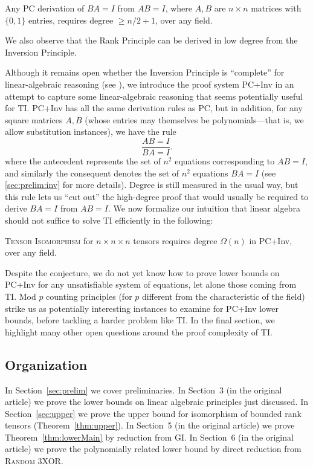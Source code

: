\begin{theorem}
Any PC derivation of $BA = I$ from $AB=I$, where $A,B$ are $n \times n$ matrices with $\{0,1\}$ entries, requires degree $\geq n/2+1$, over any field.
\end{theorem}

We also observe that the Rank Principle can be derived in low degree from the Inversion Principle. 

Although it remains open whether the Inversion Principle is ``complete'' for linear-algebraic reasoning (see \cite{soltys, SC}), we introduce the proof system PC+Inv in an attempt to capture some linear-algebraic reasoning that seems potentially useful for \textsc{TI}. PC+Inv has all the same derivation rules as PC, but in addition, for any square matrices $A,B$ (whose entries may themselves be polynomials---that is, we allow substitution instances), we have the rule
\[
\frac{AB=I}{BA=I}.
\]
where the antecedent represents the set of $n^2$ equations corresponding to $AB=I$, and similarly the consequent denotes the set of $n^2$ equations $BA=I$ (see \ref{sec:prelim:inv} for more details). Degree is still measured in the usual way, but this rule lets us ``cut out'' the high-degree proof that would usually be required to derive $BA=I$ from $AB=I$. We now formalize our intuition that linear algebra should not suffice to solve \textsc{TI} efficiently in the following:

\begin{conjecture} \label{conj:inv}
\textsc{Tensor Isomorphism} for $n \times n \times n$ tensors requires degree $\Omega(n)$ in PC+Inv, over any field.
\end{conjecture}

Despite the conjecture, we do not yet know how to prove lower bounds on PC+Inv for any unsatisfiable system of equations, let alone those coming from \textsc{TI}. Mod $p$ counting principles (for $p$ different from the characteristic of the field) strike us as potentially interesting instances to examine for PC+Inv lower bounds, before tackling a harder problem like \textsc{TI}. In the final section, we highlight many other open questions around the proof complexity of \textsc{TI}.

\subsection{Organization}
In Section~\ref{sec:prelim} we cover preliminaries. In Section~3 (in the original article) we prove the lower bounds on linear algebraic principles just discussed. In Section~\ref{sec:upper} we prove the upper bound for isomorphism of bounded rank tensors (Theorem~\ref{thm:upper}). In Section~5 (in the original article) we prove Theorem~\ref{thm:lowerMain} by reduction from \textsc{GI}. In Section~6 (in the original article) we prove the polynomially related lower bound by direct reduction from \textsc{Random 3XOR}.
